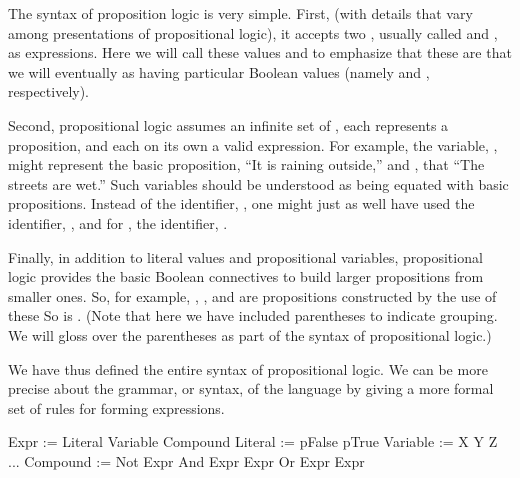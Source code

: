\documentclass[letterpaper,10pt,english]{sphinxmanual}
\begin{document}
The syntax of proposition logic is very simple. First, (with details
that vary among presentations of propositional logic), it accepts two
, usually called  and , as expressions.
Here we will call these values  and  to emphasize that
these are  that we will eventually  as having
particular Boolean values (namely  and , respectively).

Second, propositional logic assumes an infinite set of , each represents a proposition, and each on its own a valid
expression. For example, the variable, , might represent the basic
proposition, “It is raining outside,” and , that “The streets are
wet.”  Such variables should be understood as being equated with basic
propositions. Instead of the identifier, , one might just as well
have used the identifier, , and for , the
identifier, .

Finally, in addition to literal values and propositional variables,
propositional logic provides the basic Boolean connectives to build
larger propositions from smaller ones. So, for example, , , and  are propositions constructed by the use of these
 So is . (Note that here
we have included parentheses to indicate grouping. We will gloss over
the parentheses as part of the syntax of propositional logic.)

We have thus defined the entire syntax of propositional logic. We
can be more precise about the grammar, or syntax, of the language by
giving a more formal set of rules for forming expressions.

\begin{sphinxVerbatim}[commandchars=\\\{\}]
Expr       := Literal \textbar{} Variable \textbar{} Compound
Literal    := pFalse \textbar{} pTrue
Variable   := X \textbar{} Y \textbar{} Z \textbar{} ...
Compound   := Not Expr \textbar{} And Expr Expr \textbar{} Or Expr Expr
\end{sphinxVerbatim}
\end{document}
